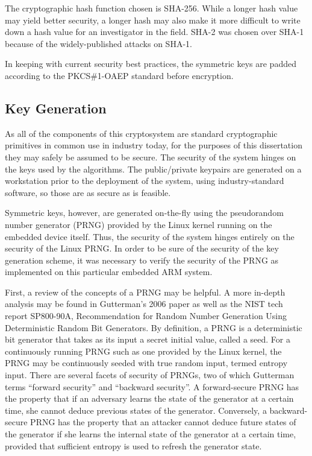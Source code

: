 The cryptographic hash function chosen is SHA-256. While a longer hash value may yield better security, a longer hash may also make
it more difficult to write down a hash value for an investigator in the field. SHA-2 was chosen over SHA-1 because of the widely-published
attacks on SHA-1\cite{Manuel2011}.

In keeping with current security best practices, the symmetric keys are padded according to the PKCS\#1-OAEP standard before encryption\cite{Bellare1995}.

\subsection{Key Generation}

As all of the components of this cryptosystem are standard cryptographic primitives in common use in industry today, for the purposes of this
dissertation they may safely be assumed to be secure. The security of the system hinges on the keys used by the algorithms. The public/private
keypairs are generated on a workstation prior to the deployment of the system, using industry-standard software, so those are as secure
as is feasible.

Symmetric keys, however, are generated on-the-fly using the pseudorandom number generator (PRNG) provided by the Linux kernel running
on the embedded device itself. Thus, the security of the system hinges entirely on the security of the Linux PRNG. In order to be sure of
the security of the key generation scheme, it was necessary to verify the security of the PRNG as implemented on this particular embedded ARM
system.

First, a review of the concepts of a PRNG may be helpful. A more in-depth analysis may be found in Gutterman's 2006 paper\cite{Gutterman2006}
as well as the NIST tech report SP800-90A, Recommendation for Random Number Generation Using Deterministic Random Bit Generators\cite{NISTSP80090A}.
By definition, a PRNG is a deterministic bit generator that takes as its input a secret initial value, called a seed\cite{NISTSP80090A}.
For a continuously running PRNG such as one provided by the Linux kernel, the PRNG may be continuously seeded with true random input, termed entropy input.
There are several facets of security of PRNGs, two of which Gutterman terms ``forward security'' and ``backward security''\cite{Gutterman2006}.
A forward-secure PRNG has the property that if an adversary learns the state of the generator at a certain time, she cannot deduce previous
states of the generator. Conversely, a backward-secure PRNG has the property that an attacker cannot deduce future states of the generator
if she learns the internal state of the generator at a certain time, provided that sufficient entropy is used to refresh the generator state.

